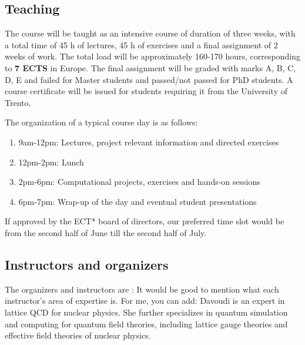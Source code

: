 \documentclass[twocolumn,superscriptaddress,amsmath,amssymb,aps,floatfix]{revtex4-2}
\newcommand{\zd}[1]{{\color{purple}{\bf ZD}: #1}}
\begin{document}
    \subsection{Teaching}\label{teaching}

The course will be taught as an intensive course of duration of three
weeks, with a total time of 45 h of lectures, 45 h of exercises and a
final assignment of 2 weeks of work. The total load will be
approximately 160-170 hours, corresponding to \textbf{7 ECTS} in Europe.
The final assignment will be graded with marks A, B, C, D, E and failed
for Master students and passed/not passed for PhD students. A course
certificate will be issued for students requiring it from the University
of Trento.

The organization of a typical course day is as follows:

\begin{enumerate}
\def\labelenumi{\arabic{enumi}.}
\item
  9am-12pm: Lectures, project relevant information and directed
  exercises
\item
  12pm-2pm: Lunch
\item
  2pm-6pm: Computational projects, exercises and hands-on sessions
\item
  6pm-7pm: Wrap-up of the day and eventual student presentations
\end{enumerate}

If approved by the ECT* board of directors, our preferred time slot
would be from the second half of June till the second half of July.

    \subsection{Instructors and organizers}\label{instructors-and-organizers}

The organizers and instructors are \zd{It would be good to mention what each instructor's area of expertise is. For me, you can add: Davoudi is an expert in lattice QCD for nuclear physics. She further specializes in quantum simulation and computing for quantum field theories, including lattice gauge theories and effective field theories of nuclear physics.}
\end{document}
